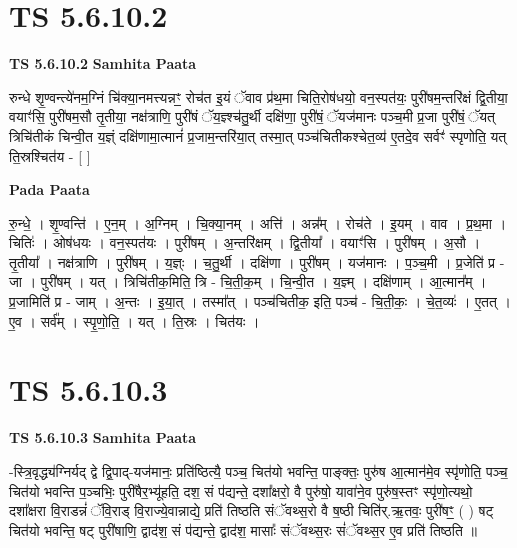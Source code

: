 \documentclass[17pt]{extarticle}
\begin{document}

\section{ TS 5.6.10.2 }

\textbf{TS 5.6.10.2 } \newline
\textbf{Samhita Paata} \newline

रुन्धे शृ॒ण्वन्त्ये॑नम॒ग्निं चि॑क्या॒नमत्त्यन्नꣳ॒॒ रोच॑त इ॒यं ॅवाव प्र॑थ॒मा चिति॒रोष॑धयो॒ वन॒स्पत॑यः॒ पुरी॑षम॒न्तरि॑क्षं द्वि॒तीया॒ वयाꣳ॑सि॒ पुरी॑षम॒सौ तृ॒तीया॒ नक्ष॑त्राणि॒ पुरी॑षं ॅय॒ज्ञ्श्च॑तु॒र्थी दक्षि॑णा॒ पुरी॑षं॒ ॅयज॑मानः पञ्च॒मी प्र॒जा पुरी॑षं॒ ॅयत् त्रिचि॑तीकं चिन्वी॒त य॒ज्ञ्ं दक्षि॑णामा॒त्मानं॑ प्र॒जाम॒न्तरि॑या॒त् तस्मा॒त् पञ्च॑चितीकश्चेत॒व्य॑ ए॒तदे॒व सर्वꣳ॑ स्पृणोति॒ यत् ति॒स्रश्चित॑य - [  ] \newline

\textbf{Pada Paata} \newline

रु॒न्धे॒ । शृ॒ण्वन्ति॑ । ए॒न॒म् । अ॒ग्निम् । चि॒क्या॒नम् । अत्ति॑ । अन्न᳚म् । रोच॑ते । इ॒यम् । वाव । प्र॒थ॒मा । चितिः॑ । ओष॑धयः । वन॒स्पत॑यः । पुरी॑षम् । अ॒न्तरि॑क्षम् । द्वि॒तीया᳚ । वयाꣳ॑सि । पुरी॑षम् । अ॒सौ । तृ॒तीया᳚ । नक्ष॑त्राणि । पुरी॑षम् । य॒ज्ञ्ः । च॒तु॒र्थी । दक्षि॑णा । पुरी॑षम् । यज॑मानः । प॒ञ्च॒मी । प्र॒जेति॑ प्र - जा । पुरी॑षम् । यत् । त्रिचि॑तीक॒मिति॒ त्रि - चि॒ती॒क॒म् । चि॒न्वी॒त । य॒ज्ञ्म् । दक्षि॑णाम् । आ॒त्मान᳚म् । प्र॒जामिति॑ प्र - जाम् । अ॒न्तः । इ॒या॒त् । तस्मा᳚त् । पञ्च॑चितीक॒ इति॒ पञ्च॑ - चि॒ती॒कः॒ । चे॒त॒व्यः॑ । ए॒तत् । ए॒व । सर्व᳚म् । स्पृ॒णो॒ति॒ । यत् । ति॒स्रः । चित॑यः ।  \newline





\section{ TS 5.6.10.3 }

\textbf{TS 5.6.10.3 } \newline
\textbf{Samhita Paata} \newline

-स्त्रि॒वृद्ध्य॑ग्निर्यद् द्वे द्वि॒पाद्-यज॑मानः॒ प्रति॑ष्ठित्यै॒ पञ्च॒ चित॑यो भवन्ति॒ पाङ्क्तः॒ पुरु॑ष आ॒त्मान॑मे॒व स्पृ॑णोति॒ पञ्च॒ चित॑यो भवन्ति प॒ञ्चभिः॒ पुरी॑षैर॒भ्यू॑हति॒ दश॒ सं प॑द्यन्ते॒ दशा᳚क्षरो॒ वै पुरु॑षो॒ यावा॑ने॒व पुरु॑ष॒स्तꣳ स्पृ॑णो॒त्यथो॒ दशा᳚क्षरा वि॒राडन्नं॑ ॅवि॒राड् वि॒राज्ये॒वान्नाद्ये॒ प्रति॑ तिष्ठति संॅवथ्स॒रो वै ष॒ष्ठी चिति॑र्.ऋ॒तवः॒ पुरी॑षꣳ॒॒ ( ) षट् चित॑यो भवन्ति॒ षट् पुरी॑षाणि॒ द्वाद॑श॒ सं प॑द्यन्ते॒ द्वाद॑श॒ मासाः᳚ संॅवथ्स॒रः सं॑ॅवथ्स॒र ए॒व प्रति॑ तिष्ठति ॥ \newline
\end{document}

